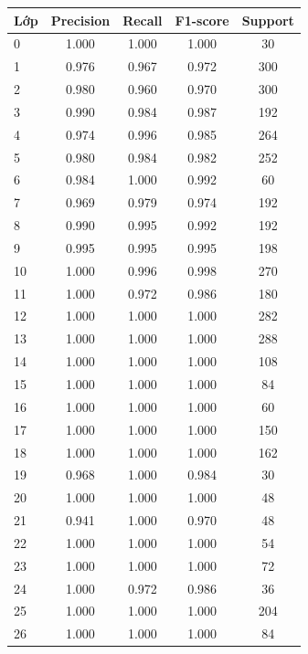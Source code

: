 \documentclass[12pt,a4paper]{article}
\begin{document}
\begin{table}[H]
\centering
\footnotesize
\begin{tabular}{@{}lcccc@{}}
\toprule
\textbf{Lớp} & \textbf{Precision} & \textbf{Recall} & \textbf{F1-score} & \textbf{Support} \\ \midrule
\rowcolor{rowgray} 0  & 1.000 & 1.000 & 1.000 & 30 \\
1  & 0.976 & 0.967 & 0.972 & 300 \\
\rowcolor{rowgray} 2  & 0.980 & 0.960 & 0.970 & 300 \\
3  & 0.990 & 0.984 & 0.987 & 192 \\
\rowcolor{rowgray} 4  & 0.974 & 0.996 & 0.985 & 264 \\
5  & 0.980 & 0.984 & 0.982 & 252 \\
\rowcolor{rowgray} 6  & 0.984 & 1.000 & 0.992 & 60 \\
7  & 0.969 & 0.979 & 0.974 & 192 \\
\rowcolor{rowgray} 8  & 0.990 & 0.995 & 0.992 & 192 \\
9  & 0.995 & 0.995 & 0.995 & 198 \\
\rowcolor{rowgray} 10 & 1.000 & 0.996 & 0.998 & 270 \\
11 & 1.000 & 0.972 & 0.986 & 180 \\
\rowcolor{rowgray} 12 & 1.000 & 1.000 & 1.000 & 282 \\
13 & 1.000 & 1.000 & 1.000 & 288 \\
\rowcolor{rowgray} 14 & 1.000 & 1.000 & 1.000 & 108 \\
15 & 1.000 & 1.000 & 1.000 & 84 \\
\rowcolor{rowgray} 16 & 1.000 & 1.000 & 1.000 & 60 \\
17 & 1.000 & 1.000 & 1.000 & 150 \\
\rowcolor{rowgray} 18 & 1.000 & 1.000 & 1.000 & 162 \\
19 & 0.968 & 1.000 & 0.984 & 30 \\
\rowcolor{rowgray} 20 & 1.000 & 1.000 & 1.000 & 48 \\
21 & 0.941 & 1.000 & 0.970 & 48 \\
\rowcolor{rowgray} 22 & 1.000 & 1.000 & 1.000 & 54 \\
23 & 1.000 & 1.000 & 1.000 & 72 \\
\rowcolor{rowgray} 24 & 1.000 & 0.972 & 0.986 & 36 \\
25 & 1.000 & 1.000 & 1.000 & 204 \\
\rowcolor{rowgray} 26 & 1.000 & 1.000 & 1.000 & 84 \\

\end{tabular}
\end{table}
\end{document}
